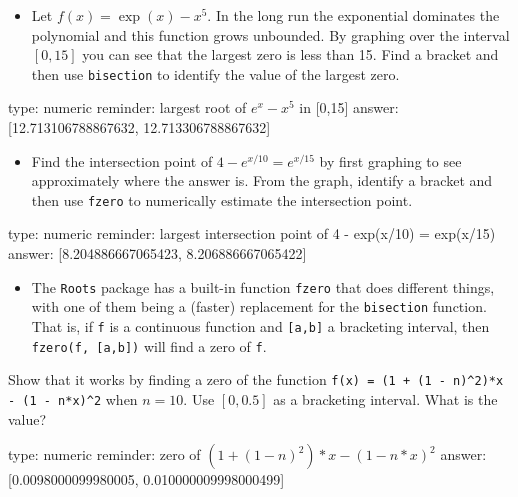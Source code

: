\documentclass[12pt]{article}
\begin{document}
\begin{itemize}
\itemsep1pt\parskip0pt
\item
  Let $f(x) = \exp(x) - x^5$. In the long run the exponential dominates
  the polynomial and this function grows unbounded. By graphing over the
  interval $[0,15]$ you can see that the largest zero is less than 15.
  Find a bracket and then use \texttt{bisection} to identify the value
  of the largest zero.
\end{itemize}

\begin{answer}
    type: numeric
    reminder: largest root of \( e^x - x^5 \) in [0,15]
    answer: [12.713106788867632, 12.713306788867632]

\end{answer}

\begin{itemize}
\itemsep1pt\parskip0pt
\item
  Find the intersection point of $4 - e^{x/10} = e^{x/15}$ by first
  graphing to see approximately where the answer is. From the graph,
  identify a bracket and then use \texttt{fzero} to numerically estimate
  the intersection point.
\end{itemize}

\begin{answer}
    type: numeric
    reminder: largest intersection point of  4 - exp(x/10) = exp(x/15)
    answer: [8.204886667065423, 8.206886667065422]

\end{answer}

\begin{itemize}
\itemsep1pt\parskip0pt
\item
  The \texttt{Roots} package has a built-in function \texttt{fzero} that
  does different things, with one of them being a (faster) replacement
  for the \texttt{bisection} function. That is, if \texttt{f} is a
  continuous function and \texttt{{[}a,b{]}} a bracketing interval, then
  \texttt{fzero(f, {[}a,b{]})} will find a zero of \texttt{f}.
\end{itemize}

Show that it works by finding a zero of the function
\texttt{f(x) = (1 + (1 - n)\^{}2)*x - (1 - n*x)\^{}2} when $n=10$. Use
$[0, 0.5]$ as a bracketing interval. What is the value?

\begin{answer}
    type: numeric
    reminder: zero of  \( (1 + (1-n)^2)*x - (1-n*x)^2 \)
    answer: [0.0098000099980005, 0.010000009998000499]

\end{answer}
\end{document}

